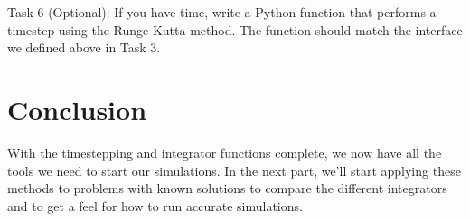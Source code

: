 \documentclass[main.tex]{subfiles}
\begin{document}
Task 6 (Optional):
If you have time, write a Python function that performs a timestep using the Runge Kutta method.
The function should match the interface we defined above in Task 3.

\section{Conclusion}

With the timestepping and integrator functions complete, we now have all the tools we need to start our simulations.
In the next part, we'll start applying these methods to problems with known solutions to compare the different integrators and to get a feel for how to run accurate simulations.
\end{document}
